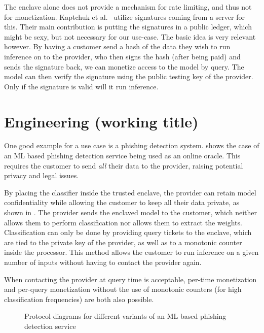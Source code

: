 \documentclass[11pt,twocolumn]{article}
\begin{document}
The enclave alone does not provide a mechanism for rate limiting, and thus not for monetization.
Kaptchuk et al.~\cite{kaptchuk_giving_nodate} utilize signatures coming from a server for this.
Their main contribution is putting the signatures in a public ledger, which might be sexy, but not necessary for our use-case.
The basic idea is very relevant however.
By having a customer send a hash of the data they wish to run inference on to the provider, who then signs the hash (after being paid) and sends the signature back, we can monetize access to the model by query.
The model can then verify the signature using the public testing key of the provider.
Only if the signature is valid will it run inference.

\section{Engineering (working title)}
\label{sec:engineering}

One good example for a use case is a phishing detection system.
 shows the case of an ML based phishing detection service being used as an online oracle.
This requires the customer to send \emph{all} their \mail{} data to the provider, raising potential privacy and legal issues.

By placing the classifier inside the trusted enclave, the provider can retain model confidentiality while allowing the customer to keep all their data private, as shown in .
The provider sends the enclaved model to the customer, which neither allows them to perform classification nor allows them to extract the weights.
Classification can only be done by providing query tickets to the enclave, which are tied to the private key of the provider, as well as to a monotonic counter inside the processor.
This method allows the customer to run inference on a given number of inputs without having to contact the provider again.

When contacting the provider at query time is acceptable, per-time monetization and per-query monetization without the use of monotonic counters (for high classification frequencies) are both also possible.

\begin{figure}[h]
    \begin{subfigure}[b]{0.5\textwidth}
        
		\label{fig:online-phishing}
    \end{subfigure}

    \begin{subfigure}[b]{0.5\textwidth}
        
        \label{fig:offline-phishing}
    \end{subfigure}
	\caption{Protocol diagrams for different variants of an ML based phishing detection service}
\end{figure}
\end{document}
